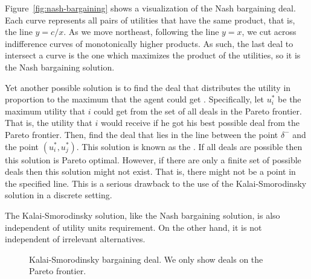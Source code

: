 Figure~\ref{fig:nash-bargaining} shows a visualization of the Nash
bargaining deal. Each curve represents all pairs of utilities that
have the same product, that is, the line $y = c/x$. As we move
northeast, following the line $y=x$, we cut across indifference curves
of monotonically higher products. As such, the last deal to intersect
a curve is the one which maximizes the product of the utilities, so it
is the Nash bargaining solution.

\medskip

Yet another possible solution is to find the deal that distributes the
utility in proportion to the maximum that the agent could get
\cite{kalai75a}. Specifically, let $u_i^*$ be the maximum utility that
$i$ could get from the set of all deals in the Pareto frontier. That
is, the utility that $i$ would receive if he got his best possible
deal from the Pareto frontier. Then, find the deal that lies in the
line between the point $\delta^-$ and the point $(u_i^*,u_j^*)$. This
solution is known as the . If all
deals are possible then this solution is Pareto optimal. However, if
there are only a finite set of possible deals then this solution might
not exist. That is, there might not be a point in the specified line.
This is a serious drawback to the use of the Kalai-Smo\-ro\-dinsky
solution in a discrete setting.  

The Kalai-Smo\-ro\-dinsky solution, like the Nash bargaining solution,
is also independent of utility units requirement. On the other
hand, it is not independent of irrelevant alternatives.

\begin{SCfigure}
  \begin{minipage}{1.0\linewidth}
    \begin{center}
\end{center}
  \end{minipage}
\caption{Kalai-Smo\-ro\-dinsky bargaining deal. We only show deals on
  the Pareto frontier.}
  \label{fig:kalai-deal}
\end{SCfigure}



